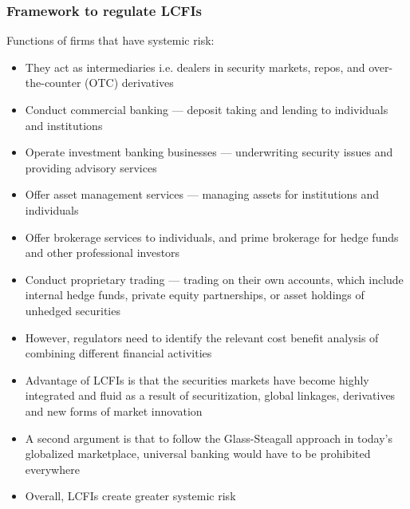 \documentclass[11pt]{beamer}
\begin{document}
\begin{frame}
\frametitle{Framework to regulate LCFIs}
Functions of firms that have systemic risk:
\begin{itemize}
\item They act as intermediaries i.e. dealers in security markets, repos, and over-the-counter (OTC) derivatives
\item Conduct commercial banking — deposit taking and lending to individuals and institutions
\item Operate investment banking businesses — underwriting security issues and providing advisory services
\item Offer asset management services — managing assets for institutions and individuals
\item Offer brokerage services to individuals, and prime brokerage for hedge funds and other professional investors
\item Conduct proprietary trading — trading on their own accounts, which include internal hedge funds, private equity partnerships, or asset holdings of unhedged securities
\end{itemize}
\end{frame}

\begin{frame}
\begin{itemize}
\item However, regulators need to identify the relevant cost benefit analysis of combining different financial activities
\item Advantage of LCFIs is that the securities markets have become highly integrated and fluid as a result of securitization, global linkages, derivatives and new forms of market innovation
\item A second argument is that to follow the Glass-Steagall approach
in today’s globalized marketplace, universal banking would have to be prohibited everywhere
\item Overall, LCFIs create greater systemic risk
\end{itemize}
\end{frame}
\end{document}
